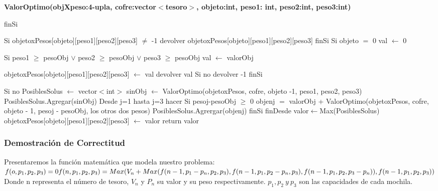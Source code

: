 \documentclass[spanish,12pt]{article}
\begin{document}
{\begin{algorithm}[H]{\textbf{ValorOptimo(objXpeso:4-upla, cofre:vector$<$tesoro$>$, objeto:int, peso1: int, peso2:int, peso3:int)}}
\begin{algorithmic}[1]
		\State finSi

		\State Si objetoxPesos[objeto][peso1][peso2][peso3] $\neq$ -1
			\State \quad devolver objetoxPesos[objeto][peso1][peso2][peso3] 
		\State finSi
		\State Si objeto $=$ 0
			\State \quad val $\gets$ 0 

			\State \quad Si peso1 $\ge$ pesoObj $\vee$ peso2 $\ge$ pesoObj $\vee$ peso3 $\ge$ pesoObj
				\State\quad \quad  val $\gets$ valorObj 

				\State \quad \quad objetoxPesos[objeto][peso1][peso2][peso3] $\gets$ val 
				\State \quad \quad devolver val
			\State \quad Si no
				\State \quad \quad devolver -1 %
			\State \quad finSi

		\State Si no
			\State \quad PosiblesSolus $\gets$ vector$<$int$>$ 
			\State \quad sinObj $\gets$ ValorOptimo(objetoxPesos, cofre, objeto -1, peso1, peso2, peso3)
			\State \quad PosiblesSolus.Agregar(sinObj)
			\State \quad Desde j=1 hasta j=3 hacer
				\State \quad \quad Si pesoj-pesoObj $\ge$ 0
					\State \quad \quad \quad objenj $=$ valorObj + ValorOptimo(objetoxPesos, cofre, objeto - 1, pesoj - pesoObj, los otros dos pesos)
					\State \quad \quad \quad PosiblesSolus.Agrergar(objenj)
				\State \quad \quad finSi
			\State \quad finDesde	
			\State \quad  valor$\gets$Max(PosiblesSolus)
			\State \quad objetoxPesos[objeto][peso1][peso2][peso3] $\gets$ valor
			\State \quad return valor
		\EndIf


	\end{algorithmic}
\end{algorithm}

\newpage

\subsubsection{Demostración de Correctitud}
Presentaremos la función matemática que modela nuestro problema:\\ %

$f(o,p_{1},p_{2},p_{3})=0 \\
f(n,p_{1},p_{2},p_{3}) = Max(V_{n}+Max(f(n-1,p_{1}-p_{n},p_{2},p_{3}), f(n-1,p_{1},p_{2}-p_{n},p_{3}), f(n-1,p_{1},p_{2},p_{3}-p_{n})),f(n-1,p_{1},p_{2},p_{3})) $
\\
Donde n representa el número de tesoro, $V_{n}$ y $P_{n}$ su valor y su peso respectivamente. $p_{1},p_{2}\ y \ p_{3}$ son las capacidades de cada mochila.

}
\end{document}
